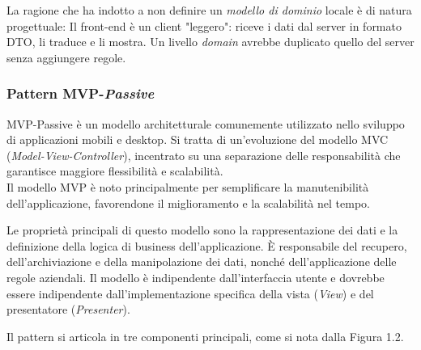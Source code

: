 La ragione che ha indotto a non definire un \textit{modello di dominio} locale è di natura progettuale: 
Il front-end è un client "leggero": riceve i dati dal server in formato DTO, li traduce e li mostra. Un livello \textit{domain} avrebbe duplicato quello del server senza aggiungere regole.


\subsubsection{Pattern MVP-\textit{Passive}}
MVP-Passive è un modello architetturale comunemente utilizzato nello sviluppo 
di applicazioni mobili e desktop. Si tratta di un'evoluzione del modello MVC (\textit{Model-View-Controller}), incentrato su una separazione delle responsabilità che garantisce maggiore flessibilità e scalabilità.  \\
\indent Il modello MVP è noto principalmente per semplificare la manutenibilità dell'applicazione, favorendone il miglioramento e la scalabilità nel tempo.

Le proprietà principali di questo modello sono la rappresentazione dei dati e la definizione della logica di business dell'applicazione. È responsabile del recupero, dell'archiviazione e della manipolazione dei dati, nonché dell'applicazione delle regole aziendali. Il modello è indipendente dall'interfaccia utente e dovrebbe essere indipendente dall'implementazione specifica della vista (\textit{View}) e del presentatore (\textit{Presenter}).

Il pattern si articola in tre componenti principali, come si nota dalla Figura 1.2.

